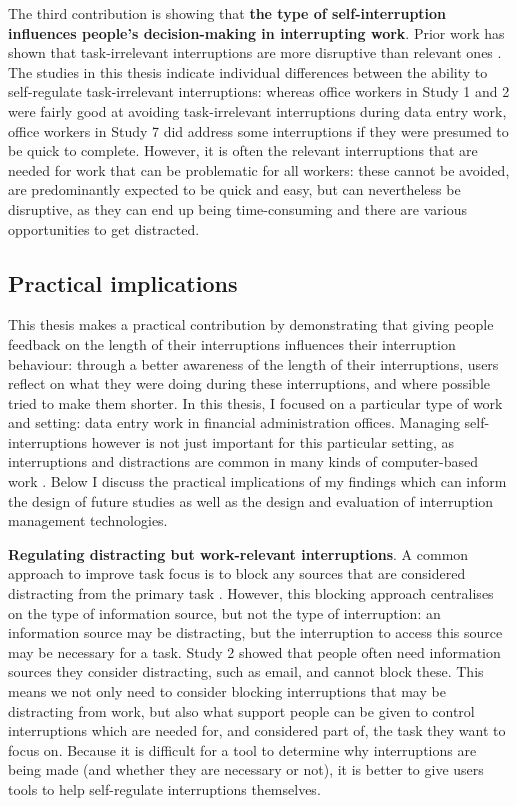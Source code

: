 The third contribution is showing that \textbf{the type of self-interruption influences people’s decision-making in interrupting work}. Prior work has shown that task-irrelevant interruptions are more disruptive than relevant ones \citep{Iqbal2008}. The studies in this thesis indicate individual differences between the ability to self-regulate task-irrelevant interruptions: whereas office workers in Study 1 and 2 were fairly good at avoiding task-irrelevant interruptions during data entry work, office workers in Study 7 did address some interruptions if they were presumed to be quick to complete. However, it is often the relevant interruptions that are needed for work that can be problematic for all workers: these cannot be avoided, are predominantly expected to be quick and easy, but can nevertheless be disruptive, as they can end up being time-consuming and there are various opportunities to get distracted. 

\subsection{Practical implications}
This thesis makes a practical contribution by demonstrating that giving people feedback on the length of their interruptions influences their interruption behaviour: through a better awareness of the length of their interruptions, users reflect on what they were doing during these interruptions, and where possible tried to make them shorter. In this thesis, I focused on a particular type of work and setting: data entry work in financial administration offices. Managing self-interruptions however is not just important for this particular setting, as interruptions and distractions are common in many kinds of computer-based work \citep{Gonzalez2004}. Below I discuss the practical implications of my findings which can inform the design of future studies as well as the design and evaluation of interruption management technologies. 

\textbf{Regulating distracting but work-relevant interruptions}. A common approach to improve task focus is to block any sources that are considered distracting from the primary task \citep{Kim2017, Mark2018}. However, this blocking approach centralises on the type of information source, but not the type of interruption: an information source may be distracting, but the interruption to access this source may be necessary for a task. Study 2 showed that people often need information sources they consider distracting, such as email, and cannot block these. This means we not only need to consider blocking interruptions that may be distracting from work, but also what support people can be given to control interruptions which are needed for, and considered part of, the task they want to focus on. Because it is difficult for a tool to determine why interruptions are being made (and whether they are necessary or not), it is better to give users tools to help self-regulate interruptions themselves. 

